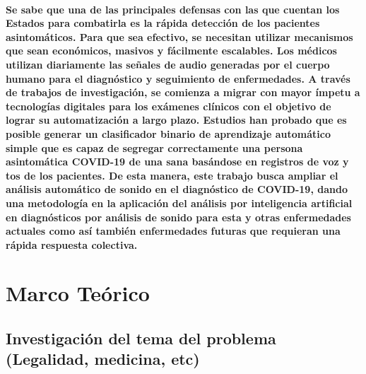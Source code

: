 \documentclass[12pt]{article}
\begin{document}
\paragraph{
Se sabe que una de las principales defensas con las que cuentan los Estados para combatirla es la rápida detección de los pacientes asintomáticos. Para que sea efectivo, se necesitan utilizar mecanismos que sean económicos, masivos y fácilmente escalables.
Los médicos utilizan diariamente las señales de audio generadas por el cuerpo humano para el diagnóstico y seguimiento de enfermedades.
A través de trabajos de investigación, se comienza a migrar con mayor ímpetu a tecnologías digitales para los exámenes clínicos con el objetivo de lograr su automatización a largo plazo.
Estudios han probado que es posible generar un clasificador binario de aprendizaje automático simple que es capaz de segregar correctamente una persona asintomática COVID-19 de una sana basándose en registros de voz y tos de los pacientes.
De esta manera, este trabajo busca ampliar el análisis automático de sonido en el diagnóstico de COVID-19, dando una metodología en la aplicación del análisis por inteligencia artificial en diagnósticos por análisis de sonido para esta y otras enfermedades actuales como así también enfermedades futuras que requieran una rápida respuesta colectiva.}
\section{Marco Teórico}
\subsection{Investigación del tema del problema (Legalidad, medicina, etc)}
\end{document}
